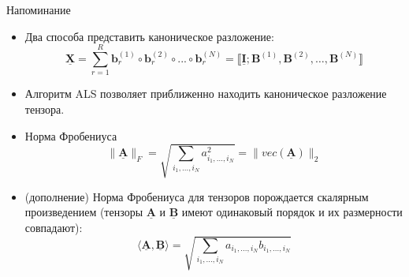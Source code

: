 
\usepackage{tikz}
\usepackage{amsmath}
\usepackage[english,russian]{babel}
\usepackage[labelformat=empty]{caption}

\usepackage{graphicx,animate}
\usepackage{animate}
\usepackage{svg}
\usepackage{subcaption}

\usepackage{ stmaryrd }

\usetikzlibrary{arrows,shapes,positioning,shadows,trees}
\newcommand*{\defeq}{\stackrel{\text{def}}{=}}
\newcommand{\tensor}[1]{\underline{\textbf{#1}}}
\newcommand{\M}[1]{\textbf{#1}}
\newcommand{\norm}[1]{\lVert #1 \rVert }

\begin{frame}[plain]
\titlepage
\end{frame}
\begin{frame}{Напоминание}
 

\begin{itemize}
    \item Два способа представить каноническое разложение:
$$\tensor{X} = \sum_{r=1}^R \M{b}_r^{(1)} \circ \M{b}_r^{(2)} \circ ... \circ \M{b}_r^{(N)} =  \llbracket \tensor{I}; \M{B}^{(1)}, \M{B}^{(2)}, \dots,  \M{B}^{(N)} \rrbracket$$

    \item Алгоритм ALS позволяет приближенно находить каноническое разложение тензора.

    \item Норма Фробениуса
    $$\lVert\tensor{A}\rVert_F = \sqrt{\sum_{i_1,...,i_N}a_{i_1,...,i_N}^2} = \lVert vec(\tensor{A}) \rVert_2$$
    \item (дополнение) Норма Фробениуса для тензоров порождается скалярным произведением (тензоры $\tensor{A}$ и $\tensor{B}$ имеют одинаковый порядок и их размерности совпадают):
    $$ \langle \tensor{A}, \tensor{B} \rangle = \sqrt{\sum_{i_1,...,i_N}a_{i_1,...,i_N}b_{i_1,...,i_N}} $$
\end{itemize}

\end{frame}
